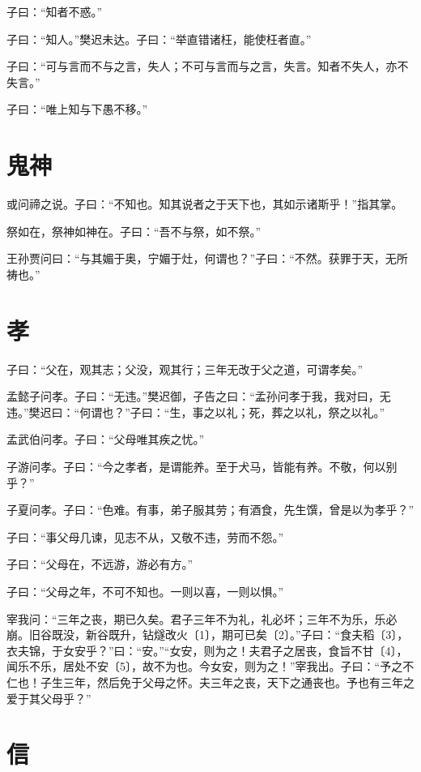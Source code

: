 \documentclass[a5paper]{ctexbook}
\begin{document}
    子曰：“知者不惑。”

    子曰：“知人。”樊迟未达。子曰：“举直错诸枉，能使枉者直。”

    子曰：“可与言而不与之言，失人；不可与言而与之言，失言。知者不失人，亦不失言。”

    子曰：“唯上知与下愚不移。”

    \chapter{鬼神}

    或问禘之说。子曰：“不知也。知其说者之于天下也，其如示诸斯乎！”指其掌。

    祭如在，祭神如神在。子曰：“吾不与祭，如不祭。”

    王孙贾问曰：“与其媚于奥，宁媚于灶，何谓也？”子曰：“不然。获罪于天，无所祷也。”

    \chapter{孝}

    子曰：“父在，观其志；父没，观其行；三年无改于父之道，可谓孝矣。”

    孟懿子问孝。子曰：“无违。”樊迟御，子告之曰：“孟孙问孝于我，我对曰，无违。”樊迟曰：“何谓也？”子曰：“生，事之以礼；死，葬之以礼，祭之以礼。”

    孟武伯问孝。子曰：“父母唯其疾之忧。”

    子游问孝。子曰：“今之孝者，是谓能养。至于犬马，皆能有养。不敬，何以别乎？”

    子夏问孝。子曰：“色难。有事，弟子服其劳；有酒食，先生馔，曾是以为孝乎？”

    子曰：“事父母几谏，见志不从，又敬不违，劳而不怨。”

    子曰：“父母在，不远游，游必有方。”

    子曰：“父母之年，不可不知也。一则以喜，一则以惧。”

    宰我问：“三年之丧，期已久矣。君子三年不为礼，礼必坏；三年不为乐，乐必崩。旧谷既没，新谷既升，钻燧改火〔1〕，期可已矣〔2〕。”子曰：“食夫稻〔3〕，衣夫锦，于女安乎？”曰：“安。”“女安，则为之！夫君子之居丧，食旨不甘〔4〕，闻乐不乐，居处不安〔5〕，故不为也。今女安，则为之！”宰我出。子曰：“予之不仁也！子生三年，然后免于父母之怀。夫三年之丧，天下之通丧也。予也有三年之爱于其父母乎？”

    \chapter{信}
\end{document}
